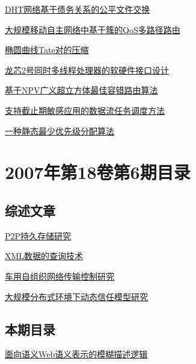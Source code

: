 \documentclass[a4paper]{article}
\begin{document}
\href{http://www.jos.org.cn/ch/reader/download_pdf.aspx?file_no=20070723&year_id=2007&quarter_id=7&falg=1}{DHT网络基于债务关系的公平文件交换}

\href{http://www.jos.org.cn/ch/reader/download_pdf.aspx?file_no=20070724&year_id=2007&quarter_id=7&falg=1}{大规模移动自主网络中基于簇的QoS多路径路由}

\href{http://www.jos.org.cn/ch/reader/download_pdf.aspx?file_no=20070725&year_id=2007&quarter_id=7&falg=1}{椭圆曲线Tate对的压缩}

\href{http://www.jos.org.cn/ch/reader/download_pdf.aspx?file_no=20070726&year_id=2007&quarter_id=7&falg=1}{龙芯2号同时多线程处理器的软硬件接口设计}

\href{http://www.jos.org.cn/ch/reader/download_pdf.aspx?file_no=20070727&year_id=2007&quarter_id=7&falg=1}{基于NPV广义超立方体最佳容错路由算法}

\href{http://www.jos.org.cn/ch/reader/download_pdf.aspx?file_no=20070728&year_id=2007&quarter_id=7&falg=1}{支持截止期敏感应用的数据流任务调度方法}

\href{http://www.jos.org.cn/ch/reader/download_pdf.aspx?file_no=20070729&year_id=2007&quarter_id=7&falg=1}{一种静态最少优先级分配算法}


\section{\textbf{2007年第18卷第6期目录}}
\subsection{综述文章}
\href{http://www.jos.org.cn/ch/reader/download_pdf.aspx?file_no=20070612&year_id=2007&quarter_id=6&falg=1}{P2P持久存储研究}

\href{http://www.jos.org.cn/ch/reader/download_pdf.aspx?file_no=20070613&year_id=2007&quarter_id=6&falg=1}{XML数据的查询技术}

\href{http://www.jos.org.cn/ch/reader/download_pdf.aspx?file_no=20070619&year_id=2007&quarter_id=6&falg=1}{车用自组织网络传输控制研究}

\href{http://www.jos.org.cn/ch/reader/download_pdf.aspx?file_no=20070622&year_id=2007&quarter_id=6&falg=1}{大规模分布式环境下动态信任模型研究}

\subsection{本期目录}
\href{http://www.jos.org.cn/ch/reader/download_pdf.aspx?file_no=20070601&year_id=2007&quarter_id=6&falg=1}{面向语义Web语义表示的模糊描述逻辑}
\end{document}

